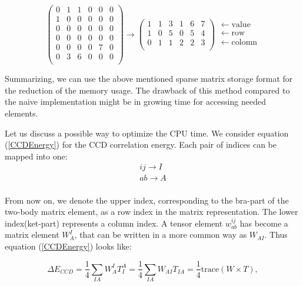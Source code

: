 \documentclass[twoside,english]{uiofysmaster}
\begin{document}
\[
\begin{pmatrix} 

0 & 1 & 1 & 0 & 0 & 0 \\
1 & 0 & 0 & 0 & 0 & 0 \\
0 & 0 & 0 & 0 & 0 & 0\\
0 & 0 & 0 & 0 & 0 & 0\\
0 & 0 & 0 & 0 & 7 & 0\\
0 & 3 & 6 & 0 & 0 & 0 \\
\end{pmatrix} \rightarrow
\begin{pmatrix} 
1 & 1 & 3 & 1 & 6 & 7 \\
1 & 0 & 5 & 0 & 5 & 4 \\
0 & 1 & 1 & 2 & 2 & 3 \\
\end{pmatrix}
\begin{matrix} 
\leftarrow \mathrm{value} \\
\leftarrow \mathrm{row}\\
\leftarrow \mathrm{colomn}\\
\end{matrix}
\]

Summarizing, we can use the above mentioned sparse matrix storage format for the reduction of the memory usage. The drawback of this method compared to the naive implementation might be in growing time for accessing needed elements.

Let us discuss a possible way to optimize the CPU time. We consider
equation (\ref{CCDEnergy}) for the CCD correlation energy. Each pair
of indices can be mapped into one:
\[
\begin{matrix} 
ij \rightarrow I \\
ab \rightarrow A \\
\end{matrix} 
\]

From now on, we denote the upper index, corresponding to the bra-part of the two-body matrix element, as a row index in the matrix representation. The lower index(ket-part) represents a column index. A tensor element $w_{ab}^{ij}$ has become a matrix element $W_{A}^{I}$, that can be written in a more common way as $W_{AI}$.
Thus equation (\ref{CCDEnergy}) looks like:

\begin{equation}
\Delta E_{CCD} = \frac{1}{4} \sum_{IA} W_{A}^{I} T_{I}^{A} = \frac{1}{4} \sum_{IA} W_{AI} T_{IA} = \frac{1}{4} \text{trace}(W\times T),
\end{equation}
\end{document}

